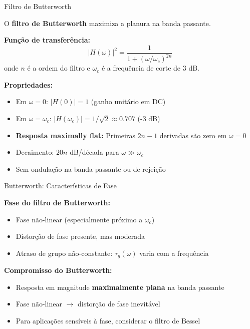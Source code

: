 \begin{frame}{Filtro de Butterworth}

O \textbf{filtro de Butterworth} maximiza a planura na banda passante.

\textbf{Função de transferência:}
\[
|H(\omega)|^2 = \frac{1}{1 + (\omega/\omega_c)^{2n}}
\]
onde $n$ é a ordem do filtro e $\omega_c$ é a frequência de corte de 3 dB.

\textbf{Propriedades:}
\begin{itemize}
\item Em $\omega = 0$: $|H(0)| = 1$ (ganho unitário em DC)
\item Em $\omega = \omega_c$: $|H(\omega_c)| = 1/\sqrt{2} \approx 0.707$ (-3 dB)
\item \textbf{Resposta maximally flat:} Primeiras $2n-1$ derivadas são zero em $\omega = 0$
\item Decaimento: $20n$ dB/década para $\omega \gg \omega_c$
\item Sem ondulação na banda passante ou de rejeição
\end{itemize}

\end{frame}


\begin{frame}{Butterworth: Características de Fase}

\textbf{Fase do filtro de Butterworth:}
\begin{itemize}
\item Fase não-linear (especialmente próximo a $\omega_c$)
\item Distorção de fase presente, mas moderada
\item Atraso de grupo não-constante: $\tau_g(\omega)$ varia com a frequência
\end{itemize}

\vspace{0.3cm}

\textbf{Compromisso do Butterworth:}
\begin{itemize}
\item Resposta em magnitude \textbf{maximalmente plana} na banda passante
\item Fase não-linear $\rightarrow$ distorção de fase inevitável
\item Para aplicações sensíveis à fase, considerar o filtro de Bessel
\end{itemize}

\end{frame}

